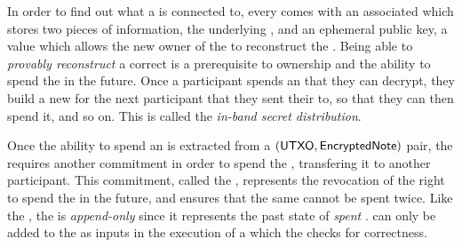 
In order to find out what \Asset{} a \UTXO{} is connected to, every \UTXO{} comes with an associated \EncryptedNote{} which stores two pieces of information, the underlying \Asset{}, and an ephemeral public key, a value which allows the new owner of the \Asset{} to reconstruct the \UTXO{}. Being able to \emph{provably reconstruct} a correct \UTXO{} is a prerequisite to ownership and the ability to spend the \Asset{} in the future. Once a participant spends an \Asset{} that they can decrypt, they build a new \EncryptedNote{} for the next participant that they sent their  to, so that they can then spend it, and so on. This is called the \emph{in-band secret distribution}.


Once the ability to spend an \Asset{} is extracted from a $({\textsf{UTXO}}, {\textsf{EncryptedNote}})$ pair, the \ShieldedAssetPool{} requires another commitment in order to spend the \Asset{}, transfering it to another participant. This commitment, called the \VoidNumber{}, represents the revocation of the right to spend the \Asset{} in the future, and ensures that the same \Asset{} cannot be spent twice. Like the \UTXOSet{}, the \VoidNumberSet{} is \emph{append-only} since it represents the past state of \emph{spent} .  can only be added to the \VoidNumberSet{} as inputs in the execution of a \Transfer{} which the \Ledger{} checks for correctness.
